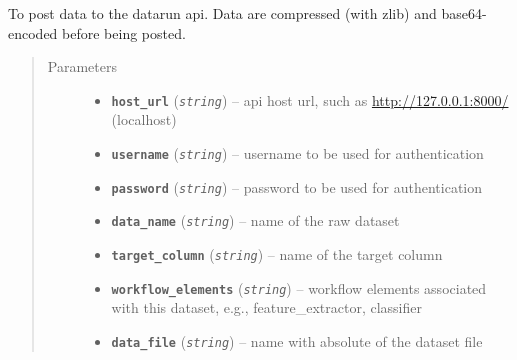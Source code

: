 \documentclass[letterpaper,10pt,english]{sphinxmanual}
\begin{document}
\begin{fulllineitems}
\label{modules/views:test_files.post_api.post_data}
To post data to the datarun api.    Data are compressed (with zlib) and base64-encoded before being posted.
\begin{quote}\begin{description}
\item[{Parameters}] \leavevmode\begin{itemize}
\item {} 
\textbf{\texttt{host\_url}} (\emph{\texttt{string}}) -- api host url, such as \url{http://127.0.0.1:8000/} (localhost)

\item {} 
\textbf{\texttt{username}} (\emph{\texttt{string}}) -- username to be used for authentication

\item {} 
\textbf{\texttt{password}} (\emph{\texttt{string}}) -- password to be used for authentication

\item {} 
\textbf{\texttt{data\_name}} (\emph{\texttt{string}}) -- name of the raw dataset

\item {} 
\textbf{\texttt{target\_column}} (\emph{\texttt{string}}) -- name of the target column

\item {} 
\textbf{\texttt{workflow\_elements}} (\emph{\texttt{string}}) -- workflow elements associated with this dataset,    e.g., feature\_extractor, classifier

\item {} 
\textbf{\texttt{data\_file}} (\emph{\texttt{string}}) -- name with absolute of the dataset file

\end{itemize}

\end{description}\end{quote}

\end{fulllineitems}

\end{document}
